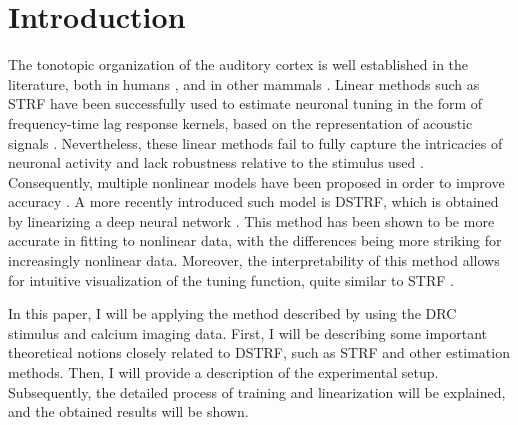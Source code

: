 \chapter{Introduction}\label{introduction}

The tonotopic organization of the auditory cortex is well established in the literature, both in humans \parencite{saenzTonotopicMappingHuman2014}, and in other mammals \parencite{realeTonotopicOrganizationAuditory1980,bizleyFunctionalOrganizationFerret2005}. Linear methods such as STRF have been successfully used to estimate neuronal tuning in the form of frequency-time lag response kernels, based on the representation of acoustic signals \parencite{aertsenSpectrotemporalReceptiveFields1980a}. Nevertheless, these linear methods fail to fully capture the intricacies of neuronal activity and lack robustness relative to the stimulus used \parencite{ahrensNonlinearitiesContextualInfluences2008}. Consequently, multiple nonlinear models have been proposed in order to improve accuracy \parencite{meyerModelsNeuronalStimulusResponse2017}. A more recently introduced such model is DSTRF, which is obtained by linearizing a deep neural network \parencite{keshishianEstimatingInterpretingNonlinear2020}. This method has been shown to be more accurate in fitting to nonlinear data, with the differences being more striking for increasingly nonlinear data. Moreover, the interpretability of this method allows for intuitive visualization of the tuning function, quite similar to STRF \parencite{keshishianEstimatingInterpretingNonlinear2020}.

In this paper, I will be applying the method described by \textcite{keshishianEstimatingInterpretingNonlinear2020} using the DRC stimulus and calcium imaging data. First, I will be describing some important theoretical notions closely related to DSTRF, such as STRF and other estimation methods. Then, I will provide a description of the experimental setup.  Subsequently, the detailed process of training and linearization will be explained, and the obtained results will be shown.
